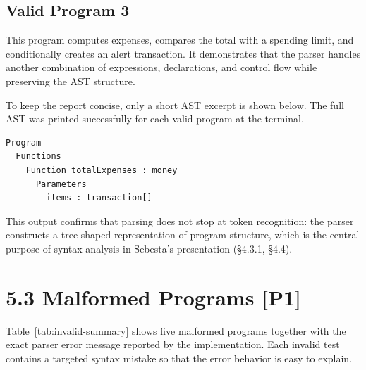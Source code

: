 \documentclass[11pt]{article}
\begin{document}
\subsection*{Valid Program 3}
This program computes expenses, compares the total with a spending limit, and conditionally creates an alert transaction. It demonstrates that the parser handles another combination of expressions, declarations, and control flow while preserving the AST structure.



To keep the report concise, only a short AST excerpt is shown below. The full AST was printed successfully for each valid program at the terminal.

\begin{verbatim}
Program
  Functions
    Function totalExpenses : money
      Parameters
        items : transaction[]
\end{verbatim}

This output confirms that parsing does not stop at token recognition: the parser constructs a tree-shaped representation of program structure, which is the central purpose of syntax analysis in Sebesta's presentation (\S4.3.1, \S4.4).

\section*{5.3 Malformed Programs [P1]}
Table~\ref{tab:invalid-summary} shows five malformed programs together with the exact parser error message reported by the implementation. Each invalid test contains a targeted syntax mistake so that the error behavior is easy to explain.
\end{document}
